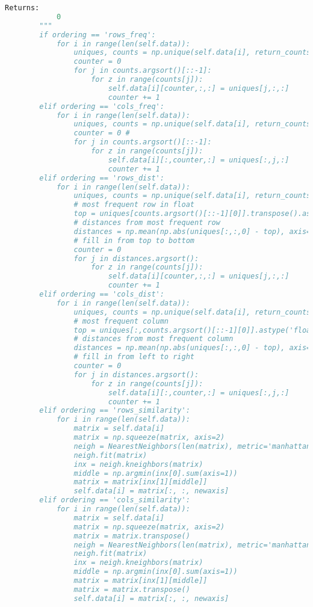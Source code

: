 \begin{lstlisting}[language=Python, breaklines]
        Returns:
            0
        """
        if ordering == 'rows_freq':
            for i in range(len(self.data)):
                uniques, counts = np.unique(self.data[i], return_counts=True, axis=0)
                counter = 0
                for j in counts.argsort()[::-1]:
                    for z in range(counts[j]):
                        self.data[i][counter,:,:] = uniques[j,:,:]
                        counter += 1
        elif ordering == 'cols_freq':
            for i in range(len(self.data)):
                uniques, counts = np.unique(self.data[i], return_counts=True, axis=1)
                counter = 0 #
                for j in counts.argsort()[::-1]:
                    for z in range(counts[j]):
                        self.data[i][:,counter,:] = uniques[:,j,:]
                        counter += 1
        elif ordering == 'rows_dist':
            for i in range(len(self.data)):
                uniques, counts = np.unique(self.data[i], return_counts=True, axis=0)
                # most frequent row in float
                top = uniques[counts.argsort()[::-1][0]].transpose().astype('float32')
                # distances from most frequent row
                distances = np.mean(np.abs(uniques[:,:,0] - top), axis=1)
                # fill in from top to bottom
                counter = 0
                for j in distances.argsort():
                    for z in range(counts[j]):
                        self.data[i][counter,:,:] = uniques[j,:,:]
                        counter += 1
        elif ordering == 'cols_dist':
            for i in range(len(self.data)):
                uniques, counts = np.unique(self.data[i], return_counts=True, axis=1)
                # most frequent column
                top = uniques[:,counts.argsort()[::-1][0]].astype('float32')
                # distances from most frequent column
                distances = np.mean(np.abs(uniques[:,:,0] - top), axis=0)
                # fill in from left to right
                counter = 0
                for j in distances.argsort():
                    for z in range(counts[j]):
                        self.data[i][:,counter,:] = uniques[:,j,:]
                        counter += 1
        elif ordering == 'rows_similarity':
            for i in range(len(self.data)):
                matrix = self.data[i]
                matrix = np.squeeze(matrix, axis=2)
                neigh = NearestNeighbors(len(matrix), metric='manhattan')
                neigh.fit(matrix)
                inx = neigh.kneighbors(matrix)
                middle = np.argmin(inx[0].sum(axis=1))
                matrix = matrix[inx[1][middle]]
                self.data[i] = matrix[:, :, newaxis]
        elif ordering == 'cols_similarity':
            for i in range(len(self.data)):
                matrix = self.data[i]
                matrix = np.squeeze(matrix, axis=2)
                matrix = matrix.transpose()
                neigh = NearestNeighbors(len(matrix), metric='manhattan')
                neigh.fit(matrix)
                inx = neigh.kneighbors(matrix)
                middle = np.argmin(inx[0].sum(axis=1))
                matrix = matrix[inx[1][middle]]
                matrix = matrix.transpose()
                self.data[i] = matrix[:, :, newaxis]
        

\end{lstlisting}
